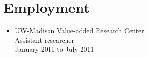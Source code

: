 \section*{Employment}

\begin{itemize}
\item UW-Madison Value-added Research Center \\
Assistant researcher \\
January 2011 to July 2011 
\end{itemize}
